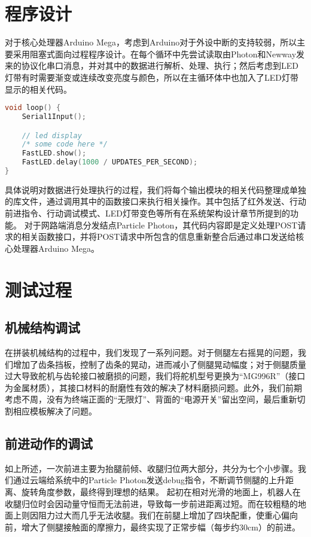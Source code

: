 \section{程序设计}
    \hspace{1.5em}对于核心处理器Arduino Mega，考虑到Arduino对于外设中断的支持较弱，所以主要采用阻塞式面向过程程序设计。在每个循环中先尝试读取由Photon和Newway发来的协议化串口消息，并对其中的数据进行解析、处理、执行；然后考虑到LED灯带有时需要渐变或连续改变亮度与颜色，所以在主循环体中也加入了LED灯带显示的相关代码。
    \begin{lstlisting}[language={C++}]
void loop() {
    Serial1Input();

    // led display
    /* some code here */
    FastLED.show();
    FastLED.delay(1000 / UPDATES_PER_SECOND);
}
    \end{lstlisting}
    \hspace{1.5em}具体说明对数据进行处理执行的过程，我们将每个输出模块的相关代码整理成单独的库文件，通过调用其中的函数接口来执行相关操作。其中包括了红外发送、行动前进指令、行动调试模式、LED灯带变色等所有在系统架构设计章节所提到的功能。
    \hspace{1.5em}对于网路端消息分发结点Particle Photon，其代码内容即是定义处理POST请求的相关函数接口，并将POST请求中所包含的信息重新整合后通过串口发送给核心处理器Arduino Mega。

\section{测试过程}
    \subsection{机械结构调试}
    \hspace{1.5em}在拼装机械结构的过程中，我们发现了一系列问题。对于侧腿左右摇晃的问题，我们增加了齿条挡板，控制了齿条的晃动，进而减小了侧腿晃动幅度；对于侧腿质量过大导致舵机与齿轮接口被磨损的问题，我们将舵机型号更换为“MG996R”（接口为金属材质），其接口材料的耐磨性有效的解决了材料磨损问题。此外，我们前期考虑不周，没有为终端正面的“无限灯”、背面的“电源开关”留出空间，最后重新切割相应模板解决了问题。

    \subsection{前进动作的调试}
    \hspace{1.5em}如上所述，一次前进主要为抬腿前倾、收腿归位两大部分，共分为七个小步骤。我们通过云端给系统中的Particle Photon发送debug指令，不断调节侧腿的上升距离、旋转角度参数，最终得到理想的结果。
    \hspace{1.5em}起初在相对光滑的地面上，机器人在收腿归位时会因动量守恒而无法前进，导致每一步前进距离过短。而在较粗糙的地面上则因阻力过大而几乎无法收腿。我们在前腿上增加了四块配重，使重心偏向前，增大了侧腿接触面的摩擦力，最终实现了正常步幅（每步约30cm）的前进。

